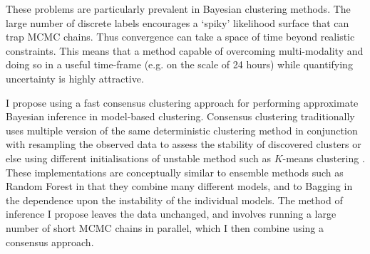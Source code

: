 \documentclass[12pt]{article} %
\begin{document}
	
	These problems are particularly prevalent in Bayesian clustering methods. The large number of discrete labels encourages a `spiky' likelihood surface that can trap MCMC chains. Thus convergence can take a space of time beyond realistic constraints. This means that a method capable of overcoming multi-modality and doing so in a useful time-frame (e.g. on the scale of 24 hours) while quantifying uncertainty is highly attractive. 
	
	I propose using a fast consensus clustering approach for performing approximate Bayesian inference in model-based clustering.  Consensus clustering traditionally uses multiple version of the same deterministic clustering method in conjunction with resampling the observed data to assess the stability of discovered clusters or else using different initialisations of unstable method such as $K$-means clustering \citep{MontiConsensusClusteringResamplingBased}. These implementations are conceptually similar to ensemble methods such as Random Forest \citep{BreimanRandomForests2001} in that they combine many different models, and to Bagging \citep{BreimanBaggingpredictors1996} in the dependence upon the instability of the individual models. The method of inference I propose leaves the data unchanged, and involves running a large number of short MCMC chains in parallel, which I then combine using a consensus approach. 
	
		
	
\end{document}
